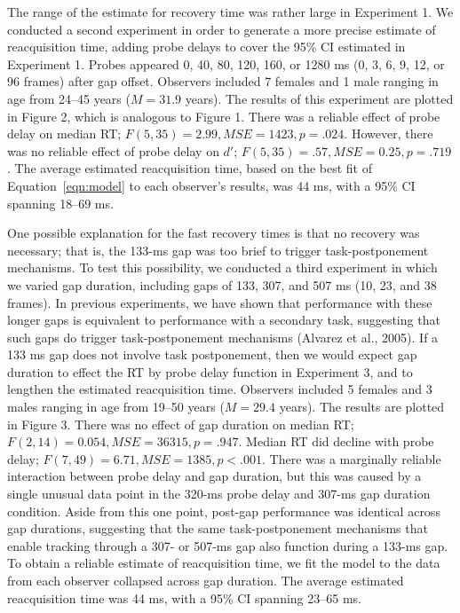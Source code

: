 \documentclass[man,nobf]{apa}
\newcommand{\MSE}{\ensuremath{\mathit{MSE}}}
\begin{document}
The range of the estimate for recovery time was rather large in Experiment
1.  We conducted a second experiment in order to generate a more precise
estimate of reacquisition time, adding probe delays to cover the 95\% CI
estimated in Experiment 1.  Probes appeared 0, 40, 80, 120, 160, or 1280 ms
(0, 3, 6, 9, 12, or 96 frames) after gap offset.  Observers included 7
females and 1 male ranging in age from 24--45 years ($M = 31.9$ years).
The results of this experiment are plotted in Figure 2, which is analogous
to Figure 1.  There was a reliable effect of probe delay on median RT;
$F(5, 35) = 2.99, \MSE = 1423, p = .024$.  However, there was no reliable
effect of probe delay on $d'$; $F(5, 35) = .57, \MSE = 0.25, p = .719$.
The average estimated reacquisition time, based on the best fit of
Equation~\ref{eqn:model} to each observer's results, was 44 ms, with a 95\%
CI spanning 18--69 ms.

One possible explanation for the fast recovery times is that no recovery
was necessary; that is, the 133-ms gap was too brief to trigger
task-postponement mechanisms.  To test this possibility, we conducted a
third experiment in which we varied gap duration, including gaps of 133,
307, and 507 ms (10, 23, and 38 frames). In previous experiments, we have
shown that performance with these longer gaps is equivalent to performance
with a secondary task, suggesting that such gaps do trigger
task-postponement mechanisms (Alvarez et al., 2005).  If a 133 ms gap does
not involve task postponement, then we would expect gap duration to effect
the RT by probe delay function in Experiment 3, and to lengthen the
estimated reacquisition time.  Observers included 5 females and 3 males
ranging in age from 19--50 years ($M = 29.4$ years). The results are
plotted in Figure 3.  There was no effect of gap duration on median RT;
$F(2, 14) = 0.054, \MSE = 36315, p = .947$.  Median RT did decline with
probe delay; $F(7, 49) = 6.71, \MSE = 1385, p < .001$.  There was a
marginally reliable interaction between probe delay and gap duration, but
this was caused by a single unusual data point in the 320-ms probe delay
and 307-ms gap duration condition.  Aside from this one point, post-gap
performance was identical across gap durations, suggesting that the same
task-postponement mechanisms that enable tracking through a 307- or 507-ms
gap also function during a 133-ms gap.  To obtain a reliable estimate of
reacquisition time, we fit the model to the data from each observer
collapsed across gap duration.  The average estimated reacquisition time
was 44 ms, with a 95\% CI spanning 23--65 ms.
\end{document}
